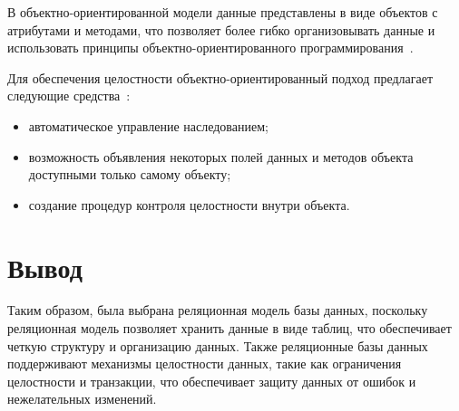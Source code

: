 В объектно-ориентированной модели данные представлены в виде объектов с атрибутами и методами, что позволяет более гибко организовывать данные и использовать принципы объектно-ориентированного программирования~\cite{db-models}. 

Для обеспечения целостности объектно-ориентированный подход предлагает следующие средства~\cite{OOM}:
\begin{itemize}[label=---]
    \item автоматическое управление наследованием;
    \item возможность объявления некоторых полей данных и методов объекта доступными только самому объекту;
    \item создание процедур контроля целостности внутри объекта.
\end{itemize}

\section{Вывод}
Таким образом, была выбрана реляционная модель базы данных, поскольку реляционная модель позволяет хранить данные в виде таблиц, что обеспечивает четкую структуру и организацию данных.
Также реляционные базы данных поддерживают механизмы целостности данных, такие как ограничения целостности и транзакции, что обеспечивает защиту данных от ошибок и нежелательных изменений.
